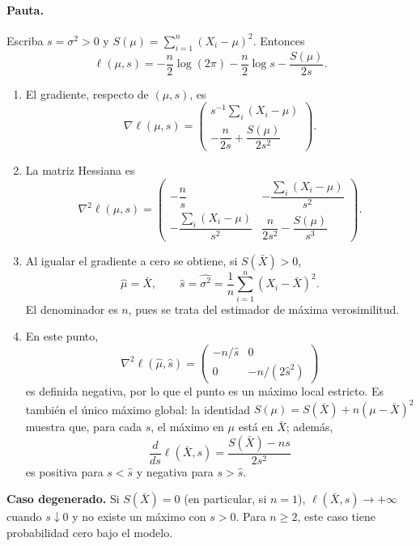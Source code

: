 \documentclass[a4paper,12 pt]{article}
\theoremstyle{definition}
\begin{document}
\paragraph{Pauta.}
Escriba $s=\sigma^2>0$ y $S(\mu)=\sum_{i=1}^n(X_i-\mu)^2$. Entonces
\[
\ell(\mu,s)=-\frac n2\log(2\pi)-\frac n2\log s-\frac{S(\mu)}{2s}.
\]
\begin{enumerate}
    \item El gradiente, respecto de $(\mu,s)$, es
    \[
    \boxed{\nabla\ell(\mu,s)=
    \begin{pmatrix}
    s^{-1}\sum_i(X_i-\mu)\\[2pt]
    -\dfrac{n}{2s}+\dfrac{S(\mu)}{2s^2}
    \end{pmatrix}.}
    \]
    \item La matriz Hessiana es
    \[
    \boxed{\nabla^2\ell(\mu,s)=
    \begin{pmatrix}
    -\dfrac ns & -\dfrac{\sum_i(X_i-\mu)}{s^2}\\[5pt]
    -\dfrac{\sum_i(X_i-\mu)}{s^2} &
    \dfrac{n}{2s^2}-\dfrac{S(\mu)}{s^3}
    \end{pmatrix}.}
    \]
    \item Al igualar el gradiente a cero se obtiene, si $S(\bar X)>0$,
    \[
    \boxed{\widehat\mu=\bar X,\qquad
    \widehat s=\widehat{\sigma^2}=\frac1n\sum_{i=1}^n(X_i-\bar X)^2.}
    \]
    El denominador es $n$, pues se trata del estimador de máxima verosimilitud.
    \item En este punto,
    \[
    \nabla^2\ell(\widehat\mu,\widehat s)=
    \begin{pmatrix}-n/\widehat s&0\\0&-n/(2\widehat s^2)\end{pmatrix}
    \]
    es definida negativa, por lo que el punto es un máximo local estricto.
    Es también el único máximo global: la identidad
    $S(\mu)=S(\bar X)+n(\mu-\bar X)^2$ muestra que, para cada $s$,
    el máximo en $\mu$ está en $\bar X$; además,
    \[
    \frac{d}{ds}\ell(\bar X,s)=\frac{S(\bar X)-ns}{2s^2}
    \]
    es positiva para $s<\widehat s$ y negativa para $s>\widehat s$.
\end{enumerate}
\noindent\textbf{Caso degenerado.} Si $S(\bar X)=0$ (en particular, si $n=1$),
$\ell(\bar X,s)\to+\infty$ cuando $s\downarrow0$ y no existe un máximo
con $s>0$. Para $n\geq2$, este caso tiene probabilidad cero bajo el modelo.
\end{document}
